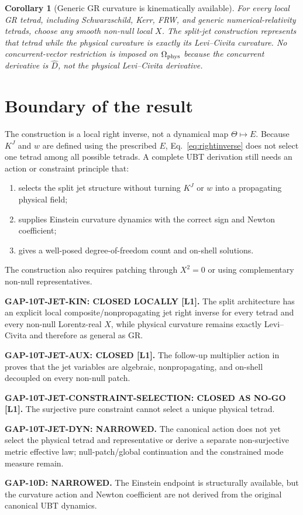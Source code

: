 \documentclass[11pt,a4paper]{article}
\newtheorem{corollary}[theorem]{Corollary}
\begin{document}
\begin{corollary}[Generic GR curvature is kinematically available]
For every local GR tetrad, including Schwarzschild, Kerr, FRW, and generic
numerical-relativity tetrads, choose any smooth non-null local $X$.  The
split-jet construction represents that tetrad while the physical curvature is
exactly its Levi--Civita curvature.  No concurrent-vector restriction is
imposed on $\Omega_{\rm phys}$ because the concurrent derivative is
$\widehat D$, not the physical Levi--Civita derivative.
\end{corollary}

\section{Boundary of the result}
The construction is a local right inverse, not a dynamical map
$\Theta\mapsto E$.  Because $K^J$ and $w$ are defined using the prescribed
$E$, Eq.~\eqref{eq:rightinverse} does not select one tetrad among all possible
tetrads.  A complete UBT derivation still needs an action or constraint
principle that:
\begin{enumerate}
 \item selects the split jet structure without turning $K^J$ or $w$ into a
 propagating physical field;
 \item supplies Einstein curvature dynamics with the correct sign and Newton
 coefficient;
 \item gives a well-posed degree-of-freedom count and on-shell solutions.
\end{enumerate}
The construction also requires patching through $X^2=0$ or using complementary
non-null representatives.

\begin{tcolorbox}[colback=green!6!white,colframe=green!55!black,title=Exact status]
\textbf{GAP-10T-JET-KIN: CLOSED LOCALLY [L1].}
The split architecture has an explicit local composite/nonpropagating jet right
inverse for every tetrad and every non-null Lorentz-real $X$, while physical
curvature remains exactly Levi--Civita and therefore as general as GR.

\medskip
\textbf{GAP-10T-JET-AUX: CLOSED [L1].}
The follow-up multiplier action in
\texttt{} proves that the jet variables
are algebraic, nonpropagating, and on-shell decoupled on every non-null patch.

\medskip
\textbf{GAP-10T-JET-CONSTRAINT-SELECTION: CLOSED AS NO-GO [L1].}
The surjective pure constraint cannot select a unique physical tetrad.

\medskip
\textbf{GAP-10T-JET-DYN: NARROWED.}
The canonical action does not yet select the physical tetrad and representative
or derive a separate non-surjective metric effective law; null-patch/global
continuation and the constrained mode measure remain.

\medskip
\textbf{GAP-10D: NARROWED.}
The Einstein endpoint is structurally available, but the curvature action and
Newton coefficient are not derived from the original canonical UBT dynamics.
\end{tcolorbox}
\end{document}
